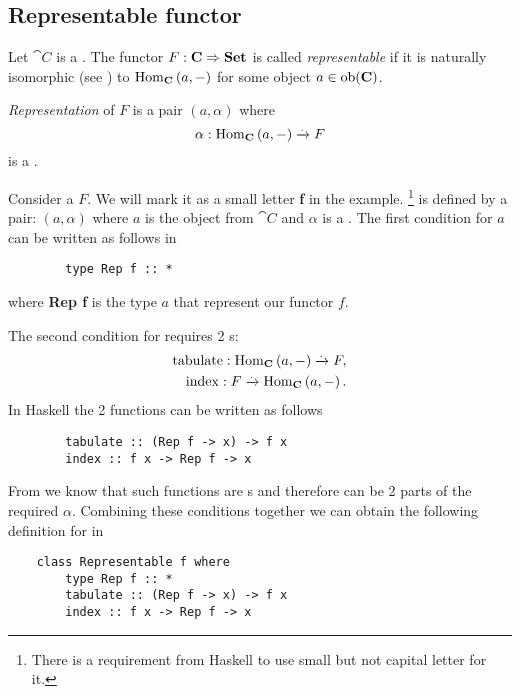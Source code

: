 \subsection{Representable functor}
\begin{definition}
\label{def:representable_functor}
Let $\cat{C}$ is a .
The functor $F: \mathbf{C} \Rightarrow \mathbf{Set}$ is called
\textit{representable} if it is naturally isomorphic (see
) to $\mathrm{Hom}_{\mathbf{C}}\left(a, -\right)$ for some object $a \in
\mathrm{ob}(\mathbf{C})$. 

\textit{Representation} of $F$ is a pair $(a, \alpha)$ where
\[
\alpha: \mathrm{Hom}_{\mathbf{C}}\left(a, -\right) \xrightarrow{.} F
\]
is a .
\end{definition}

\begin{example}
\label{ex:representable_functor_hask}
Consider a  $F$. We will mark it as a small
letter \textbf{f} in the example. 
\footnote{There is a requirement from Haskell to use small but not
  capital letter for it.}
 is defined by a pair: $(a,
\alpha)$ where $a$ is the object from $\cat{C}$ and $\alpha$ is a
. 
The first condition for $a$ can be written as follows in
\begin{verbatim}
        type Rep f :: *
\end{verbatim} 
where \textbf{Rep f} is the type $a$ that represent our functor $f$. 

The second condition for  requires 2
s: 
\begin{eqnarray}
\mathrm{tabulate} : \mathrm{Hom}_{\mathbf{C}}\left(a, -\right) \xrightarrow{.} F,
\nonumber \\
\mathrm{index} : F \xrightarrow{.} \mathrm{Hom}_{\mathbf{C}}\left(a, -\right).
\nonumber
\end{eqnarray}
In Haskell the 2 functions can be written as follows
\begin{verbatim}
        tabulate :: (Rep f -> x) -> f x
        index :: f x -> Rep f -> x
\end{verbatim} 
From
 we know that such functions are
s and therefore can be 2 parts of the required
 $\alpha$. Combining these conditions together we
can obtain the following definition for  in
\begin{verbatim}
    class Representable f where 
        type Rep f :: *
        tabulate :: (Rep f -> x) -> f x
        index :: f x -> Rep f -> x
\end{verbatim} 


\end{example}

